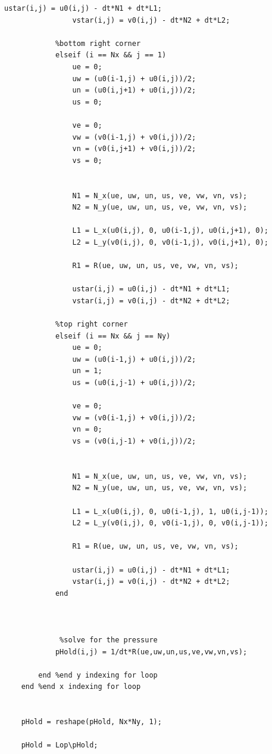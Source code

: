 \documentclass{article}
\begin{document}
\begin{itemize}
\begin{center}
\begin{lstlisting}[style = Matlab-editor]
                ustar(i,j) = u0(i,j) - dt*N1 + dt*L1;
                vstar(i,j) = v0(i,j) - dt*N2 + dt*L2;

            %bottom right corner
            elseif (i == Nx && j == 1)
                ue = 0;
                uw = (u0(i-1,j) + u0(i,j))/2;
                un = (u0(i,j+1) + u0(i,j))/2;
                us = 0;

                ve = 0;
                vw = (v0(i-1,j) + v0(i,j))/2;
                vn = (v0(i,j+1) + v0(i,j))/2;
                vs = 0;

                
                N1 = N_x(ue, uw, un, us, ve, vw, vn, vs);
                N2 = N_y(ue, uw, un, us, ve, vw, vn, vs);

                L1 = L_x(u0(i,j), 0, u0(i-1,j), u0(i,j+1), 0);
                L2 = L_y(v0(i,j), 0, v0(i-1,j), v0(i,j+1), 0);

                R1 = R(ue, uw, un, us, ve, vw, vn, vs);

                ustar(i,j) = u0(i,j) - dt*N1 + dt*L1;
                vstar(i,j) = v0(i,j) - dt*N2 + dt*L2;

            %top right corner
            elseif (i == Nx && j == Ny)
                ue = 0;
                uw = (u0(i-1,j) + u0(i,j))/2;
                un = 1;
                us = (u0(i,j-1) + u0(i,j))/2;

                ve = 0;
                vw = (v0(i-1,j) + v0(i,j))/2;
                vn = 0;
                vs = (v0(i,j-1) + v0(i,j))/2;

                
                N1 = N_x(ue, uw, un, us, ve, vw, vn, vs);
                N2 = N_y(ue, uw, un, us, ve, vw, vn, vs);

                L1 = L_x(u0(i,j), 0, u0(i-1,j), 1, u0(i,j-1));
                L2 = L_y(v0(i,j), 0, v0(i-1,j), 0, v0(i,j-1));

                R1 = R(ue, uw, un, us, ve, vw, vn, vs);

                ustar(i,j) = u0(i,j) - dt*N1 + dt*L1;
                vstar(i,j) = v0(i,j) - dt*N2 + dt*L2;
            end



             %solve for the pressure
            pHold(i,j) = 1/dt*R(ue,uw,un,us,ve,vw,vn,vs);
           
        end %end y indexing for loop
    end %end x indexing for loop


    pHold = reshape(pHold, Nx*Ny, 1);

    pHold = Lop\pHold;


\end{lstlisting}
\end{center}
\end{itemize}
\end{document}
